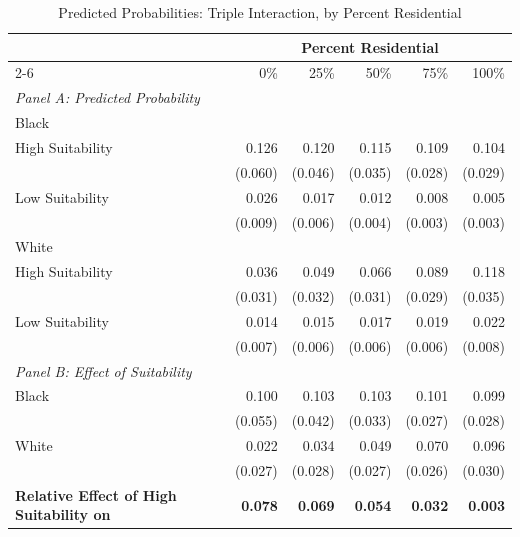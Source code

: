 \begin{table}[h]
\centering
\caption{Predicted Probabilities: Triple Interaction, by Percent Residential}
\label{tab:predicted_outcomes/suitabilityxblacksharexpctres}
\begin{threeparttable}
\begin{tabular*}{1\textwidth}{@{\extracolsep{\fill}}lr@{\hspace{1.2em}}r@{\hspace{1.2em}}r@{\hspace{1.2em}}r@{\hspace{1.2em}}r@{\hspace{1.2em}}}
\toprule
 & \multicolumn{5}{c}{Percent Residential} \\
\cmidrule(l){2-6}
 & 0\% & 25\% & 50\% & 75\% & 100\% \\
\midrule
\textit{Panel A: Predicted Probability} & & & & & \\
\addlinespace[2pt]
Black & & & & & \\
\quad High Suitability & 0.126 & 0.120 & 0.115 & 0.109 & 0.104 \\
 & (0.060) & (0.046) & (0.035) & (0.028) & (0.029) \\[4pt]
\quad Low Suitability & 0.026 & 0.017 & 0.012 & 0.008 & 0.005 \\
 & (0.009) & (0.006) & (0.004) & (0.003) & (0.003) \\[4pt]
White & & & & & \\
\quad High Suitability & 0.036 & 0.049 & 0.066 & 0.089 & 0.118 \\
 & (0.031) & (0.032) & (0.031) & (0.029) & (0.035) \\[4pt]
\quad Low Suitability & 0.014 & 0.015 & 0.017 & 0.019 & 0.022 \\
 & (0.007) & (0.006) & (0.006) & (0.006) & (0.008) \\[4pt]
\midrule
\textit{Panel B: Effect of Suitability} & & & & & \\
\addlinespace[2pt]
Black & 0.100\rlap{$^{*}$} & 0.103\rlap{$^{**}$} & 0.103\rlap{$^{***}$} & 0.101\rlap{$^{***}$} & 0.099\rlap{$^{***}$} \\
 & (0.055) & (0.042) & (0.033) & (0.027) & (0.028) \\[4pt]
White & 0.022 & 0.034 & 0.049\rlap{$^{*}$} & 0.070\rlap{$^{***}$} & 0.096\rlap{$^{***}$} \\
 & (0.027) & (0.028) & (0.027) & (0.026) & (0.030) \\[4pt]
\addlinespace[2pt]
\textbf{Relative Effect of High Suitability on} & \textbf{0.078}\rlap{$^{**}$} & \textbf{0.069}\rlap{$^{***}$} & \textbf{0.054}\rlap{$^{***}$} & \textbf{0.032} & \textbf{0.003} \\

\end{tabular*}
\end{threeparttable}
\end{table}
